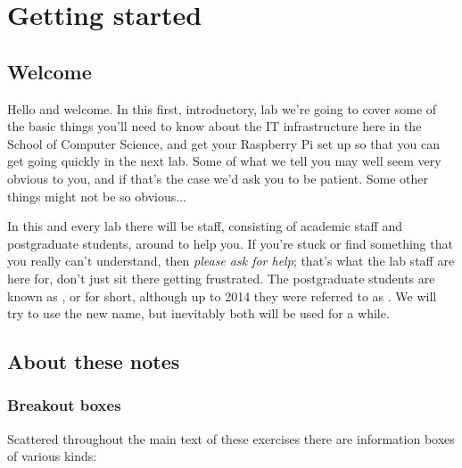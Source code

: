 
\chapter{Getting started}
\label{cha:getting-started}

\minitoc
{}

\section{Welcome}


Hello and welcome. In this first, introductory, lab we're going to
cover some of the basic things you'll need to know about the IT
infrastructure here in the School of Computer Science, and get your Raspberry Pi set up so that you can get going quickly in the next lab.
Some of what we
tell you may well seem very obvious to you, and if that's the case
we'd ask you to be patient. Some other things might not be so obvious...

In this and every lab there will be staff, consisting of academic staff and postgraduate students, around to help you. If you're stuck or find something that you really can't understand, then \emph{please ask for help}; that's what the lab staff are here for, don't just sit there getting frustrated. The postgraduate students are known as , or  for short, although up to 2014 they were referred to as . We will try to use the new name, but inevitably both will be used for a while.


\section{About these notes}
\subsection{Breakout boxes}

Scattered throughout the main text of these exercises there are information boxes of various kinds:
\\

